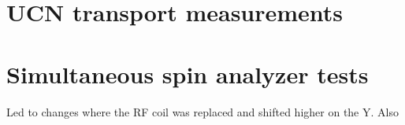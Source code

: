 \section{UCN transport measurements}










\section{Simultaneous spin analyzer tests}


Led to changes where the RF coil was replaced and shifted higher on the Y. Also 